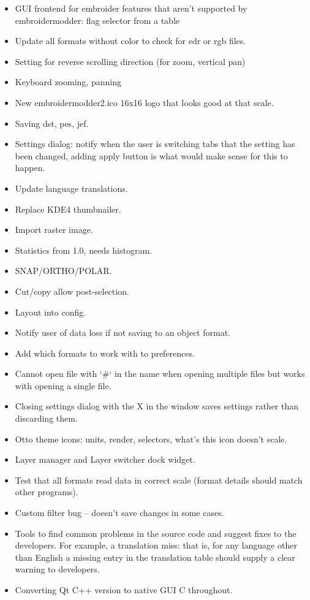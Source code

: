\begin{itemize}
\item GUI frontend for embroider features that aren't supported by embroidermodder: flag selector from a table
\item Update all formats without color to check for edr or rgb files.
\item Setting for reverse scrolling direction (for zoom, vertical pan)
\item Keyboard zooming, panning
\item New embroidermodder2.ico 16x16 logo that looks good at that scale.
\item Saving dst, pes, jef.
\item Settings dialog: notify when the user is switching tabs that the setting has been changed, adding apply button is what would make sense for this to happen.
\item Update language translations.
\item Replace KDE4 thumbnailer.
\item Import raster image.
\item Statistics from 1.0, needs histogram.
\item SNAP/ORTHO/POLAR.
\item Cut/copy allow post-selection.
\item Layout into config.
\item Notify user of data loss if not saving to an object format.
\item Add which formats to work with to preferences.
\item Cannot open file with `\#` in the name when opening multiple files but works with opening a single file.
\item Closing settings dialog with the X in the window saves settings rather than discarding them.
\item Otto theme icons: units, render, selectors, what's this icon doesn't scale.
\item Layer manager and Layer switcher dock widget.
\item Test that all formats read data in correct scale (format details should match other programs).
\item Custom filter bug -- doesn't save changes in some cases.
\item Tools to find common problems in the source code and suggest fixes to the developers. For example, a translation miss: that is, for any language other than English a missing entry in the translation table should supply a clear warning to developers.
\item Converting Qt C++ version to native GUI C throughout.

\end{itemize}
